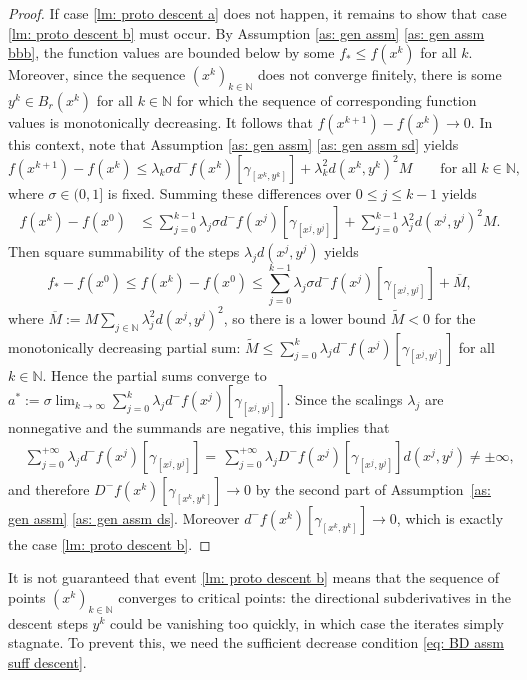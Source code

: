 \documentclass{article}
\theoremstyle{plain}\newtheorem{theorem}{Theorem}[section]
\theoremstyle{plain}\newtheorem{definition}[theorem]{Definition}
\theoremstyle{plain}\newtheorem{lemma}[theorem]{Lemma}
\theoremstyle{definition}\newtheorem{remark}[theorem]{Remark}
\theoremstyle{definition}\newtheorem{example}[theorem]{Example}
\theoremstyle{plain}\newtheorem{proposition}[theorem]{Proposition}
\theoremstyle{plain}\newtheorem{inference}[theorem]{Inference}
\theoremstyle{plain}\newtheorem{corollary}[theorem]{Corollary}
\theoremstyle{plain}\newtheorem{assumption}[theorem]{Assumption}
\newcommand{\bbN}{\mathbb{N}}
\newcommand{\Nbb}{\mathbb{N}}
\newcommand{\Mtilde}{{\widetilde{M}}}
\newcommand{\Mbar}{{\overline{M}}}
\begin{document}
\begin{proof}
    If case \eqref{lm: proto descent a} does not happen, it remains to show that case \eqref{lm: proto descent b} must occur. By Assumption \ref{as: gen assm} \eqref{as: gen assm bbb}, the function values are bounded below by some $f_*\leq f(x^k)$ for all $k$. Moreover, since the sequence $(x^k)_{k\in\bbN}$ does not converge finitely, there is some $ y^k\in B_r(x^k)$ for all $k\in\bbN$ for which the sequence of corresponding function values is monotonically decreasing.  It follows that $f(x^{k+1})-f(x^k)\to 0$. In this context, note that Assumption \ref{as: gen assm} \eqref{as: gen assm sd} yields
    $$
    f(x^{k+1})-f(x^{k})\leq\lambda_k\sigma d^-f(x^k)[\gamma_{[x^k,y^k]}]+\lambda_k^2d(x^k,y^k)^2M \qquad \text{for all}\,\, k\in\Nbb,
    $$
    where $\sigma\in(0,1]$ is fixed. Summing these differences over $0\leq j\leq k-1$ yields
    \begin{align*}
        f(x^k)-f(x^0)&\leq\sum_{j=0}^{k-1}\lambda_j \sigma d^-f(x^j)[\gamma_{[x^j,y^j]}]+\sum_{j=0}^{k-1}\lambda_j^2d(x^j,y^j)^2M.
    \end{align*}
    Then square summability of the steps $\lambda_jd(x^j,y^j)$ yields
    $$
    f_*-f(x^0)\leq f(x^k)-f(x^0)\leq\sum_{j=0}^{k-1}\lambda_j \sigma d^-f(x^j)[\gamma_{[x^j,y^j]}]+\Mbar,
    $$
    where $\Mbar:=M\sum_{j\in\bbN}\lambda_j^2d(x^j,y^j)^2$, so there is a lower bound $\Mtilde<0$ for the monotonically decreasing partial sum: $\Mtilde\leq\sum_{j=0}^k\lambda_jd^-f(x^j)[\gamma_{[x^j,y^j]}]$ for all $k\in\bbN$. Hence the partial sums converge to $a^*:=\sigma\lim_{k\to\infty}\sum_{j=0}^k\lambda_j d^-f(x^j)[\gamma_{[x^j,y^j]}]$. Since the scalings $\lambda_j$ are nonnegative and the summands  are negative, this implies that
    \begin{align*}
        &\sum_{j=0}^{+\infty}\lambda_j d^-f(x^j)[\gamma_{[x^j,y^j]}]
        =\,\sum_{j=0}^{+\infty}\lambda_j D^-f(x^j)[\gamma_{[x^j,y^j]}]d(x^j,y^j)\neq\pm\infty,
    \end{align*}
    and therefore $D^-f(x^k)[\gamma_{[x^k,y^k]}]\to 0$ by the second part of Assumption~\ref{as: gen assm} \eqref{as: gen assm ds}. Moreover $d^-f(x^k)[\gamma_{[x^k,y^k]}]\to 0$, which
    is exactly the case \eqref{lm: proto descent b}.
\end{proof}
It is not guaranteed that event \eqref{lm: proto descent b} means that the sequence of points $(x^k)_{k\in\bbN}$ converges to critical points: the directional subderivatives in the descent steps $y^k$ could be vanishing too quickly, in which case the iterates simply stagnate.  To prevent this, we need the sufficient decrease condition \eqref{eq: BD assm suff descent}.
\end{document}
